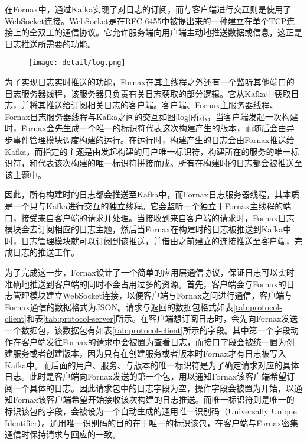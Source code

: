 在Fornax中，通过Kafka实现了对日志的订阅，而与客户端进行交互则是使用了WebSocket连接。WebSocket是在RFC 6455\supercite{websocket}中被提出来的一种建立在单个TCP连接上的全双工的通信协议。它允许服务端向用户端主动地推送数据或信息，这正是日志推送所需要的功能。

\begin{figure}[!htp]
  \centering
  \texttt{[image: detail/log.png]}
\end{figure}

为了实现日志实时推送的功能，Fornax在其主线程之外还有一个监听其他端口的日志服务器线程，该服务器只负责有关日志获取的部分逻辑。它从Kafka中获取日志，并将其推送给订阅相关日志的客户端。客户端、Fornax主服务器线程、Fornax日志服务器线程与Kafka之间的交互如图\ref{log}所示，当客户端发起一次构建时，Fornax会先生成一个唯一的标识符代表这次构建产生的版本，而随后会由异步事件管理模块调度构建的运行。在运行时，构建产生的日志会由Fornax推送给Kafka，而指定的主题是由发起构建的用户唯一标识符，构建所在的服务的唯一标识符，和代表该次构建的唯一标识符拼接而成。所有在构建时的日志都会被推送至该主题中。

因此，所有构建时的日志都会推送至Kafka中，而Fornax日志服务器线程，其本质是一个只与Kafka进行交互的独立线程。它会监听一个独立于Fornax主线程的端口，接受来自客户端的请求并处理。当接收到来自客户端的请求时，Fornax日志模块会去订阅相应的日志主题，然后当Fornax在构建时的日志被推送到Kafka中时，日志管理模块就可以订阅到该推送，并借由之前建立的连接推送至客户端，完成日志的推送工作。

为了完成这一步，Fornax设计了一个简单的应用层通信协议，保证日志可以实时准确地推送到客户端的同时不会占用过多的资源。首先，客户端会与Fornax的日志管理模块建立WebSocket连接，以便客户端与Fornax之间进行通信，客户端与Fornax通信的数据格式为JSON。请求与返回的数据包格式如表\ref{tab:protocol-client}和表\ref{tab:protocol-server}所示。在客户端想订阅日志时，会先向Fornax发送一个数据包，该数据包有如表\ref{tab:protocol-client}所示的字段。其中第一个字段动作在客户端发往Fornax的请求中会被置为查看日志，而接口字段会被统一置为创建服务或者创建版本，因为只有在创建服务或者版本时Fornax才有日志被写入Kafka中。而后面的用户、服务、与版本的唯一标识符是为了确定请求对应的具体日志。此时是客户端向Fornax发送的第一个包，用以通知Fornax该客户端希望订阅一个具体的日志。因此请求包中的日志字段为空，操作字段会被置为开始，以通知Fornax该客户端希望开始接收该次构建的日志推送。而唯一标识符则是唯一的标识该包的字段，会被设为一个自动生成的通用唯一识别码（Universally Unique Identifier）。通用唯一识别码的目的在于唯一的标识该包，在客户端与Fornax密集通信时保持请求与回应的一致。

